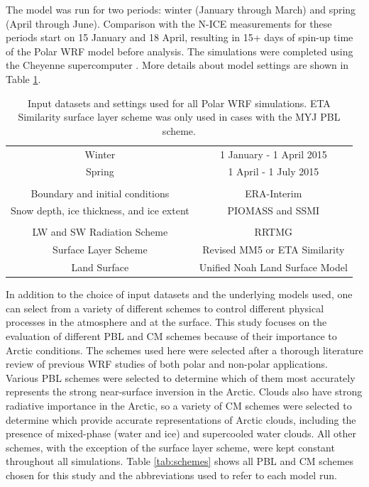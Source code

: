 The model was run for two periods: winter (January through March) and spring (April through June). Comparison with the N-ICE measurements for these periods start on 15 January and 18 April, resulting in 15+ days of spin-up time of the Polar WRF model before analysis. The simulations were completed using the Cheyenne supercomputer \citep{cheyenne}. More details about model settings are shown in Table \ref{tab:setup}. 

\begin{table}[t]
\centering
\footnotesize
\doublespacing
{
\begin{tabular}{| c | c |}
\hline
\rowcolor[HTML]{F3F3F3} \multicolumn{2}{|c|}{\textbf{Dates}} \\
\hline
Winter & 1 January - 1 April 2015 \\
Spring & 1 April - 1 July 2015 \\
\hline
 \rowcolor[HTML]{F3F3F3} \multicolumn{2}{|c|}{\textbf{Input Datasets}} \\
\hline
 Boundary and initial conditions & ERA-Interim \\
 Snow depth, ice thickness, and ice extent & PIOMASS and SSMI \\
\hline
\rowcolor[HTML]{F3F3F3} \multicolumn{2}{|c|}{\textbf{Polar WRF Settings}} \\
\hline
 LW and SW Radiation Scheme & RRTMG \\ 
 Surface Layer Scheme & Revised MM5 or ETA Similarity \\
 Land Surface & Unified Noah Land Surface Model  \\ 
  \hline
\end{tabular}}
\caption[WRF input datasets, dates, and settings.]{Input datasets and settings used for all Polar WRF simulations. ETA Similarity surface layer scheme was only used in cases with the MYJ PBL scheme.}
\label{tab:setup}
\end{table}

In addition to the choice of input datasets and the underlying models used, one can select from a variety of different schemes to control different physical processes in the atmosphere and at the surface. This study focuses on the evaluation of different PBL and CM schemes because of their importance to Arctic conditions. The schemes used here were selected after a thorough literature review of previous WRF studies of both polar and non-polar applications. Various PBL schemes were selected to determine which of them most accurately represents the strong near-surface inversion in the Arctic. Clouds also have strong radiative importance in the Arctic, so a variety of CM schemes were selected to determine which provide accurate representations of Arctic clouds, including the presence of mixed-phase (water and ice) and supercooled water clouds. All other schemes, with the exception of the surface layer scheme, were kept constant throughout all simulations. Table \ref{tab:schemes} shows all PBL and CM schemes chosen for this study and the abbreviations used to refer to each model run. 

